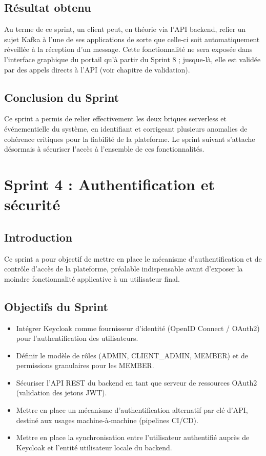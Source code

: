 \subsection{Résultat obtenu}

Au terme de ce sprint, un client peut, en théorie via l'API backend, relier un sujet Kafka à l'une de ses applications de sorte que celle-ci soit automatiquement réveillée à la réception d'un message. Cette fonctionnalité ne sera exposée dans l'interface graphique du portail qu'à partir du Sprint 8 ; jusque-là, elle est validée par des appels directs à l'API (voir chapitre de validation).

\subsection{Conclusion du Sprint}

Ce sprint a permis de relier effectivement les deux briques serverless et événementielle du système, en identifiant et corrigeant plusieurs anomalies de cohérence critiques pour la fiabilité de la plateforme. Le sprint suivant s'attache désormais à sécuriser l'accès à l'ensemble de ces fonctionnalités.


\section{Sprint 4 : Authentification et sécurité}

\subsection{Introduction}

Ce sprint a pour objectif de mettre en place le mécanisme d'authentification et de contrôle d'accès de la plateforme, préalable indispensable avant d'exposer la moindre fonctionnalité applicative à un utilisateur final.

\subsection{Objectifs du Sprint}

\begin{itemize}
    \item Intégrer Keycloak comme fournisseur d'identité (OpenID Connect / OAuth2) pour l'authentification des utilisateurs.
    \item Définir le modèle de rôles (ADMIN, CLIENT\_ADMIN, MEMBER) et de permissions granulaires pour les MEMBER.
    \item Sécuriser l'API REST du backend en tant que serveur de ressources OAuth2 (validation des jetons JWT).
    \item Mettre en place un mécanisme d'authentification alternatif par clé d'API, destiné aux usages machine-à-machine (pipelines CI/CD).
    \item Mettre en place la synchronisation entre l'utilisateur authentifié auprès de Keycloak et l'entité utilisateur locale du backend.
\end{itemize}

